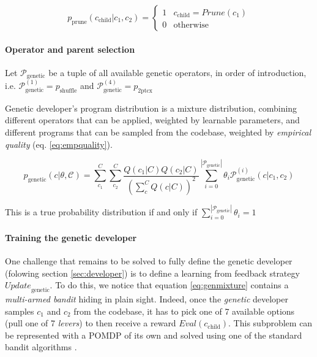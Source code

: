 \begin{equation}
    p_\text{prune}(c_\text{child}|c_1,c_2)= \begin{cases}
        1 & c_\text{child} = \mathit{Prune}(c_1) \\
        0 & \text{otherwise}
        \end{cases}
\end{equation}

\paragraph{Operator and parent selection}
\label{sec:selection}

Let $\mathcal{P}_\text{genetic}$ be a tuple of all available genetic operators, in order of introduction, i.e. $\mathcal{P}_\text{genetic}^{(1)}=p_\text{shuffle}$ and $\mathcal{P}_\text{genetic}^{(4)}=p_\text{2ptcx}$

Genetic developer's program distribution is a mixture distribution, combining different operators that can be applied, weighted by learnable parameters, and different programs that can be sampled from the codebase, weighted by \emph{empirical quality} (eq. \ref{eq:empquality}).

\begin{equation}
    p_\text{genetic}(c | \theta, \mathcal{C}) = 
    \sum\limits_{c_1}^{C}  
    \sum\limits_{c_2}^{C} 
    \frac{Q(c_1|C) Q(c_2|C)}{(\sum\limits_{c}^{C} Q(c|C))^2} 
    \sum\limits_{i=0}^{|\mathcal{P}_\text{genetic}|} 
    \theta_i \mathcal{P}_\text{genetic}^{(i)} (c|c_1,c_2)
    \label{eq:genmixture}
\end{equation}

This is a true probability distribution if and only if $\sum\limits_{i=0}^{|\mathcal{P}_\text{genetic}|} 
    \theta_i = 1$


\paragraph{Training the genetic developer}

One challenge that remains to be solved to fully define the genetic developer (folowing section \ref{sec:developer}) is to define a learning from feedback strategy $\mathit{Update}_\text{genetic}$.
To do this, we notice that equation \ref{eq:genmixture} contains a \emph{multi-armed bandit} \cite{banditproblem} hiding in plain sight.
Indeed, once the \emph{genetic} developer samples $c_1$ and $c_2$ from the codebase, it has to pick one of 7 available options (pull one of 7 \emph{levers}) to then receive a reward $\mathit{Eval}(c_\text{child})$.
This subproblem can be represented with a POMDP of its own and solved using one of the standard bandit algorithms \cite{banditsolutions}.

